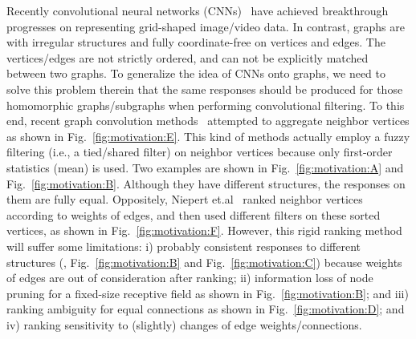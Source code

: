 \documentclass[letterpaper]{article} \usepackage{aaai19}  \usepackage{times}  \usepackage{helvet}  \usepackage{courier}  \usepackage{url}  \usepackage{graphicx}  \frenchspacing  \setlength{\pdfpagewidth}{8.5in}  \setlength{\pdfpageheight}{11in}
\def\ie{{i.e.}} \def\etal{{et.al}}
\begin{document}
Recently convolutional neural networks (CNNs)~\cite{lecun2015deep} have achieved breakthrough progresses on representing grid-shaped image/video data. In contrast, graphs are with irregular structures and fully coordinate-free on vertices and edges. The vertices/edges are not strictly ordered, and can not be explicitly matched between two graphs. To generalize the idea of CNNs onto graphs, we need to solve this problem therein that the same responses should be produced for those homomorphic graphs/subgraphs when performing convolutional filtering. To this end, recent graph convolution methods~\cite{defferrard2016convolutional,atwood2016diffusion,hamilton2017inductive} attempted to aggregate neighbor vertices as shown in Fig.~\ref{fig:motivation:E}. This kind of methods actually employ a fuzzy filtering (\ie, a tied/shared filter) on neighbor vertices because only first-order statistics (mean) is used. Two examples are shown in Fig.~\ref{fig:motivation:A} and Fig.~\ref{fig:motivation:B}. Although they have different structures, the responses on them are fully equal. Oppositely, Niepert \etal~\cite{niepert2016learning} ranked neighbor vertices according to weights of edges, and then used different filters on these sorted vertices, as shown in Fig.~\ref{fig:motivation:F}. However, this rigid ranking method will suffer some limitations: i) probably consistent responses to different structures (\eg, Fig.~\ref{fig:motivation:B} and Fig.~\ref{fig:motivation:C}) because weights of edges are out of consideration after ranking; ii) information loss of node pruning for a fixed-size receptive field as shown in Fig.~\ref{fig:motivation:B}; and iii) ranking ambiguity for equal connections as shown in Fig.~\ref{fig:motivation:D}; and iv) ranking sensitivity to (slightly) changes of edge weights/connections.
\end{document}
